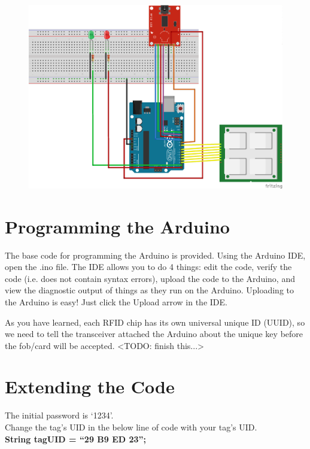 \documentclass{article}
\begin{document}
\begin{enumerate}
  \begin{figure}[H]
  \centering
  \includegraphics[width=.7\linewidth]{figures/rfid-lock4_bb.png}
  \caption{\label{fig:rfid-lock4}}
\end{figure}

\end{enumerate}

\section{Programming the Arduino}
The base code for programming the Arduino is provided. Using the Arduino IDE, open
the .ino file.  The IDE allows you to do 4 things: edit the code, verify the code
(i.e. does not contain syntax errors), upload the code to the Arduino, and view the
diagnostic output of things as they run on the Arduino.  Uploading to the Arduino is
easy! Just click the Upload arrow in the IDE.

As you have learned, each RFID chip has its own universal unique ID (UUID), so we
need to tell the transceiver attached the Arduino about the unique key before the
fob/card will be accepted. <TODO: finish this...>

\section{Extending the Code}
The initial password is ‘1234’.
\\
Change the tag’s UID in the below line of code with your tag’s UID.
\\
\textbf{String tagUID = “29 B9 ED 23”;}
\end{document}
